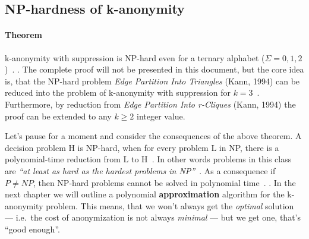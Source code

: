 \subsection{NP-hardness of k-anonymity}\label{subsec:np-hardness-of-k-anonymity}

\paragraph{Theorem} k-anonymity with suppression is NP-hard even for a ternary alphabet (\(\Sigma = {0, 1, 2}\))~\cite{aggarwal}.
.
The complete proof will not be presented in this document, but the core idea is, that the NP-hard problem \textit{Edge Partition Into Triangles} (Kann, 1994) can be reduced into the problem of k-anonymity with suppression for \(k=3\)~\cite{aggarwal}. Furthermore, by reduction from \textit{Edge Partition Into r-Cliques} (Kann, 1994) the proof can be extended to any \(k \ge 2\) integer value.

Let's pause for a moment and consider the consequences of the above theorem.
A decision problem H is NP-hard, when for every problem L in NP, there is a polynomial-time reduction from L to H~\cite{leeuwen}. In other words problems in this class are \textit{``at least as hard as the hardest problems in NP''}~\cite{wiki07}. As a consequence if \textbf{\(P \neq NP\)}, then NP-hard problems cannot be solved in polynomial time~\cite{wiki06, wiki07}.
.
In the next chapter we will outline a polynomial \textbf{approximation} algorithm for the k-anonymity problem.
This means, that we won't always get the \textit{optimal} solution --- i.e.\ the cost of anonymization is not  always \textit{minimal} --- but we get one, that's ``good enough''.